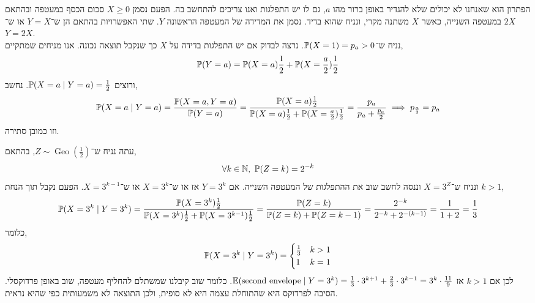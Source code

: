 הפתרון הוא שאנחנו לא יכולים שלא להגדיר באופן ברור מהו $a$, גם לו יש התפלגות ואנו צריכים להתחשב בה.
הפעם נסמן $X \ge 0$ סכום הכסף במעטפה ובהתאם $2X$ במעטפה השנייה, כאשר $X$ משתנה מקרי, ונניח שהוא בדיד.
נסמן את המדידה של המעטפה הראשונה $Y$.
שתי האפשרויות בהתאם הן ש־$Y = X$ או ש־$Y = 2X$. \\
נניח ש־$\mathbb{P}(X = 1) = p_a > 0$.
נרצה לבדוק אם יש התפלגות בדידה על $X$ כך שנקבל תוצאה נכונה.
אנו מניחים שמתקיים,
\[
	\mathbb{P}(Y = a)
	= \mathbb{P}(X = a) \frac{1}{2} + \mathbb{P}(X = \frac{a}{2}) \frac{1}{2}
\]
ורוצים $\mathbb{P}(X = a \mid Y = a) = \frac{1}{2}$.
נחשב,
\[
	\mathbb{P}(X = a \mid Y = a)
	= \frac{\mathbb{P}(X = a, Y = a)}{\mathbb{P}(Y = a)}
	= \frac{\mathbb{P}(X = a) \frac{1}{2}}{\mathbb{P}(X = a) \frac{1}{2} + \mathbb{P}(X = \frac{a}{2}) \frac{1}{2}}
	= \frac{p_a}{p_a + \frac{p_a}{2}}
	\implies p_{\frac{a}{2}} = p_a
\]
וזו כמובן סתירה.

עתה נניח ש־$Z \sim \operatorname{Geo}(\frac{1}{2})$, בהתאם,
\[
	\forall k \in \NN,\ 
	\PP(Z = k)
	= 2^{-k}
\]
ונניח ש־$X = 3^Z$ וננסה לחשב שוב את ההתפלגות של המעטפה השנייה.
אם $Y = 3^k$ אז או ש־$X = 3^k$ או ש־$X = 3^{k - 1}$.
הפעם נקבל תוך הנחת $k > 1$,
\[
	\mathbb{P}(X = 3^k \mid Y = 3^k)
	= \frac{\mathbb{P}(X = 3^k) \frac{1}{2}}{\mathbb{P}(X = 3^k) \frac{1}{2} + \mathbb{P}(X = 3^{k - 1}) \frac{1}{2}}
	= \frac{\mathbb{P}(Z = k)}{\mathbb{P}(Z = k) + \mathbb{P}(Z = k - 1)}
	= \frac{2^{-k}}{2^{-k} + 2^{-(k - 1)}}
	= \frac{1}{1 + 2}
	= \frac{1}{3}
\]
כלומר,
\[
	\mathbb{P}(X = 3^k \mid Y = 3^k)
	= \begin{cases}
		\frac{1}{3} & k > 1 \\
		1 & k = 1
	\end{cases}
\]
לכן אם $k > 1$ אז $\mathbb{E}(\text{second envelope} \mid Y = 3^k) = \frac{1}{3} \cdot 3^{k + 1} + \frac{2}{3} \cdot 3^{k - 1} = 3^k \cdot \frac{11}{9}$.
כלומר שוב קיבלנו שמשתלם להחליף מעטפה, שוב באופן פרדוקסלי.
הסיבה לפרדוקס היא שהתוחלת עצמה היא לא סופית, ולכן התוצאה לא משמעותית כפי שהיא נראית.

